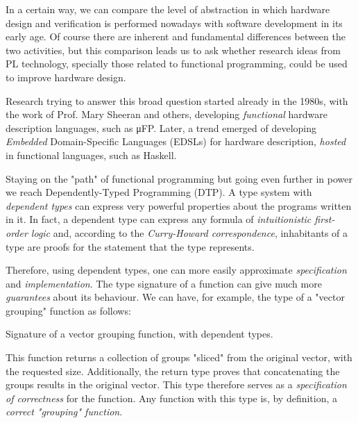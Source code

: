 \documentclass[a4paper,draft]{report}
\begin{document}
        In a certain way, we can compare the level of abstraction in which hardware design and verification
        is performed nowadays with software development in its early age.
        Of course there are inherent and fundamental differences between the two activities, but
        this comparison leads us to ask whether research ideas from PL technology,
        specially those related to functional programming, could be used to improve hardware design.

        Research trying to answer this broad question started already in the 1980s,
        with the work of Prof. Mary Sheeran and others,
        developing \emph{functional} hardware description languages, such as μFP.
        Later, a trend emerged of developing \emph{Embedded} Domain-Specific Languages (EDSLs)
        for hardware description, \emph{hosted} in functional languages, such as Haskell.

        Staying on the "path" of functional programming but going even further in power we reach
        Dependently-Typed Programming (DTP).
        A type system with \emph{dependent types} can express very powerful properties
        about the programs written in it.
        In fact, a dependent type can express any formula of \emph{intuitionistic first-order logic} and,
        according to the \emph{Curry-Howard correspondence},
        inhabitants of a type are proofs for the statement that the type represents.

        Therefore, using dependent types, one can more easily approximate \emph{specification} and \emph{implementation}.
        The type signature of a function can give much more \emph{guarantees} about its behaviour.
        We can have, for example, the type of a "vector grouping" function as follows:

        \begin{listing}[h!]
            \caption{Signature of a vector grouping function, with dependent types.
                \label{lst:group-decl}}
        \end{listing}

        This function returns a collection of groups "sliced" from the original vector, with the requested size.
        Additionally, the return type proves that concatenating the groups results in the original vector.
        This type therefore serves as a \emph{specification of correctness} for the function.
        Any function with this type is, by definition, a \emph{correct "grouping" function}.
\end{document}
